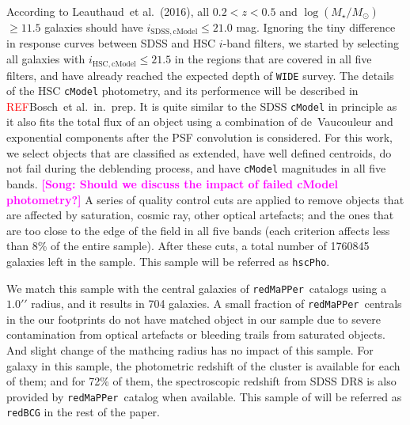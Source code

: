 \documentclass[preprint]{aastex}
\def\arcsec{{\prime\prime}}
\def\etal{{\ et al.~}}
\def\redm{\texttt{redMaPPer}~}
\def\logms{$\log (M_{\star}/M_{\odot})$}
\newcommand{\addref}{{\textcolor{red}{REF}}}
\newcommand{\song}[1]{\textcolor{magenta}{\textbf{[Song: #1]}}}
\begin{document}
\begin{CJK*}{UTF8}{gbsn}
    According to Leauthaud\etal (2016), all $0.2 < z < 0.5$ and \logms$\geq 11.5$ galaxies
    should have $i_{\mathrm{SDSS, cModel}} \leq 21.0$ mag.  Ignoring the tiny difference
    in response curves between SDSS and HSC $i$-band filters, we started by selecting all
    galaxies with $i_{\mathrm{HSC, cModel}} \leq 21.5$ in the regions that are covered in
    all five filters, and have already reached the expected depth of \texttt{WIDE} survey.  
    The details of the HSC \texttt{cModel} photometry, and its performence will be
    described in \addref Bosch\etal in.\ prep. 
    It is quite similar to the SDSS \texttt{cModel} in principle as it also fits the total
    flux of an object using a combination of de~Vaucouleur and exponential components
    after the PSF convolution is considered.  
    For this work, we select objects that are classified as extended, have well defined 
    centroids, do not fail during the deblending process, and have \texttt{cModel} 
    magnitudes in all five bands. 
    \song{Should we discuss the impact of failed cModel photometry?} 
    A series of quality control cuts are applied to remove objects that are affected by 
    saturation, cosmic ray, other optical artefacts; and the ones that are too close to 
    the edge of the field in all five bands 
    (each criterion affects less than 8\% of the entire sample).
    After these cuts, a total number of 1760845 galaxies left in the sample.
    This sample will be referred as \texttt{hscPho}. 
    
    We match this sample with the central galaxies of \redm catalogs using a $1.0\arcsec$
    radius, and it results in 704 galaxies.  
    A small fraction of \redm centrals in the our footprints do not have matched object in
    our sample due to severe contamination from optical artefacts or bleeding trails from
    saturated objects.  
    And slight change of the mathcing radius has no impact of this sample.  
    For galaxy in this sample, the photometric redshift of the cluster is available for
    each of them; and for 72\% of them, the spectroscopic redshift from SDSS DR8 is also
    provided by \redm catalog when available. 
    This sample of will be referred as \texttt{redBCG} in the rest of the paper.
    

\end{CJK*}
\end{document}
